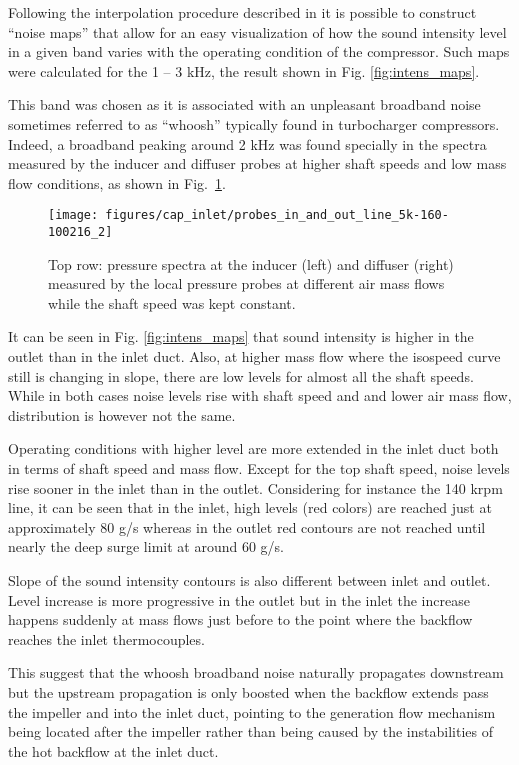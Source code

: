 Following the interpolation procedure described in \cite{torregrosa2016experimental} it is possible to construct ``noise maps'' that allow for an easy visualization of how the sound intensity level in a given band varies with the operating condition of the compressor. Such maps were calculated for the 1 -- 3 kHz, the result shown in Fig. \ref{fig:intens_maps}. 

This band was chosen as it is associated with an unpleasant broadband noise sometimes referred to as ``whoosh'' \cite{evans2005minimizing,trochon2001new} typically found in turbocharger compressors. Indeed, a broadband peaking around 2 kHz was found specially in the spectra measured by the inducer and diffuser probes at higher shaft speeds and low mass flow conditions, as shown in Fig.~\ref{fig:probes_5K}. 

\begin{figure}[thb!]
\centering
\texttt{[image: figures/cap\_inlet/probes\_in\_and\_out\_line\_5k-160-100216\_2]}
\caption{Top row: pressure spectra at the inducer (left) and diffuser (right) measured by the local pressure probes at different air mass flows while the shaft speed was kept constant.}
\label{fig:probes_5K}
\end{figure}

It can be seen in Fig. \ref{fig:intens_maps} that sound intensity is higher in the outlet than in the inlet duct. Also, at higher mass flow where the isospeed curve still is changing in slope, there are low levels for almost all the shaft speeds. While in both cases noise levels rise with shaft speed and and lower air mass flow, distribution is however not the same. 

Operating conditions with higher level are more extended in the inlet duct both in terms of shaft speed and mass flow. Except for the top shaft speed, noise levels rise sooner in the inlet than in the outlet. Considering for instance the 140 krpm line, it can be seen that in the inlet, high levels (red colors) are reached just at approximately 80 g/s whereas in the outlet red contours are not reached until nearly the deep surge limit at around 60 g/s.

Slope of the sound intensity contours is also different between inlet and outlet. Level increase is more progressive in the outlet but in the inlet the increase happens suddenly at mass flows just before to the point where the backflow reaches the inlet thermocouples. 

This suggest that the whoosh broadband noise naturally propagates downstream but the upstream propagation is only boosted when the backflow extends pass the impeller and into the inlet duct, pointing to the generation flow mechanism being located after the impeller rather than being caused by the instabilities of the hot backflow at the inlet duct.

